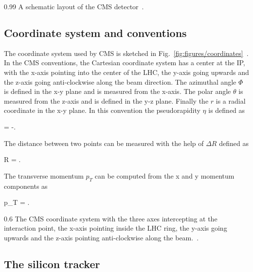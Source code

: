                  {0.99}       %
                 { A schematic layout of the CMS detector~\cite{website:CMSdet}. }

\subsection{Coordinate system and conventions}


The coordinate system used by CMS is sketched in Fig.~\ref{fig:figures/coordinates}~\cite{Pantaleo:2293435}. In the CMS conventions, the Cartesian coordinate system has a center at the IP, with the x-axis pointing into the center of the LHC, the y-axis going upwards and the z-axis going anti-clockwise along the beam direction. The azimuthal angle $\Phi$ is defined in the x-y plane and is measured from the x-axis. The polar angle $\theta$ is measured from the z-axis and is defined in the y-z plane. Finally the $r$ is a radial coordinate in the x-y plane. In this convention the pseudorapidity $\eta$ is defined as

{
    \eta =  -\ln {}.
}

The distance between two points can be measured with the help of $\Delta R$ defined as

{
    \Delta R = .
}


The transverse momentum $p_{T}$ can be computed from the x and y momentum components as

{
    p_{T} =  .
}


                 {0.6}       %
                 { The CMS coordinate system with the three axes intercepting at the interaction point, the x-axis pointing inside the LHC ring, the y-axis going upwards and the z-axis pointing anti-clockwise along the beam.~\cite{Pantaleo:2293435}. }

\subsection{The silicon tracker}

